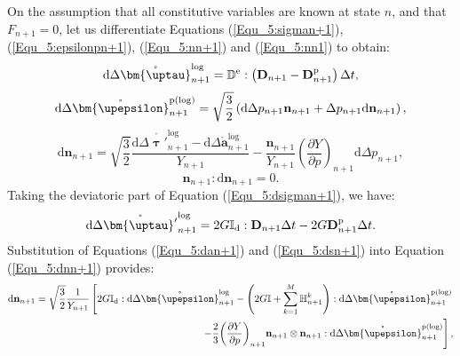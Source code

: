 On the assumption that all constitutive variables are known at state $n$, and that $F_{n+1}=0$, let us differentiate Equations (\ref{Equ_5:sigman+1}), (\ref{Equ_5:epsilonpn+1}), (\ref{Equ_5:nn+1}) and (\ref{Equ_5:nn1}) to obtain:
\begin{equation}
\label{Equ_5:dsigman+1}
{\text{d}}\Delta \mathring {\bm{\uptau}}_{n + 1}^{\log } = {\mathbb{D}^{\rm{e}}}:\left( \mathbf{D}_{n+1} - \mathbf{D}_{n+1}^{\rm p} \right) \Delta t,
\end{equation}
\begin{equation}
\label{Equ_5:depsilon+1}
{\text{d}}\Delta \mathring {\bm{\upepsilon}}_{n + 1}^{\rm p(\log) } = \sqrt {\frac{3}{2}} \left( {{\text{d}}\Delta {p_{n + 1}}{{\mathbf{n}}_{n + 1}} + \Delta {p_{n + 1}}{\text{d}}{{\mathbf{n}}_{n + 1}}} \right),
\end{equation}
\begin{equation}
\label{Equ_5:dnn+1}
{\text{d}}{{\mathbf{n}}_{n + 1}} = \sqrt {\frac{3}{2}} \frac{{{\text{d}}\Delta \mathring {{\bm{\uptau}}'}_{n + 1}^{\log } - {\text{d}}\Delta \mathring {\mathbf{a}}_{n + 1}^{\log } }}{{{Y_{n + 1}}}} - \frac{{{{\mathbf{n}}_{n + 1}}}}{{{Y_{n + 1}}}}{\left( {\frac{{\partial Y}}{{\partial p}}} \right)_{n + 1}}{\text{d}}\Delta {p_{n + 1}},
\end{equation}
\begin{equation}
{{\mathbf{n}}_{n + 1}}:{\text{d}}{{\mathbf{n}}_{n + 1}} = 0.
\end{equation}
Taking the deviatoric part of Equation (\ref{Equ_5:dsigman+1}), we have:
\begin{equation}
\label{Equ_5:dsn+1}
{\text{d}}\Delta \mathring {{\bm{\uptau}}'}_{n + 1}^{\log }  = 2G{\mathbb{I}_{\rm d}}:\mathbf{D}_{n+1} \Delta t - 2G\mathbf{D}_{n+1}^{\rm p} \Delta t.
\end{equation}
Substitution of Equations (\ref{Equ_5:dan+1}) and (\ref{Equ_5:dsn+1}) into Equation (\ref{Equ_5:dnn+1}) provides:
\begin{equation}
\label{Equ_5:dnn+12}
\begin{aligned}
{\text{d}}{{\mathbf{n}}_{n + 1}} = \sqrt {\frac{3}{2}} \frac{1}{{{Y_{n + 1}}}} \left[ {2G{\mathbb{I}_{\rm d}}:{\text{d}}\Delta \mathring {\bm{\upepsilon}}_{n + 1}^{\log } - \left( {2G\mathbb{I} + \sum\limits_{k = 1}^M {\mathbb{H}_{n + 1}^k} } \right):{\text{d}}\Delta \mathring {\bm{\upepsilon}}_{n + 1}^{\rm p(\log) } } \right.\\
\left. { - \frac{2}{3}{{\left( {\frac{{\partial Y}}{{\partial p}}} \right)}_{n + 1}}{{\mathbf{n}}_{n + 1}} \otimes {{\mathbf{n}}_{n + 1}}:{\text{d}}\Delta \mathring {\bm{\upepsilon}}_{n + 1}^{\rm p(\log) }}\right],
\end{aligned}
\end{equation}
